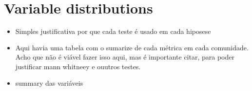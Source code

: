 \section{Variable distributions}
\label{sub:distributions}
\begin{itemize}
	\item Simples justificativa por que cada teste é usado em cada hiposese
	\item Aqui havia uma tabela com o sumarize de cada métrica em cada comunidade. Acho que não é viável fazer isso aqui, mas é importante citar, para poder  justificar mann whitneey e ouutros testes.
	\item summary das variáveis
\end{itemize}
